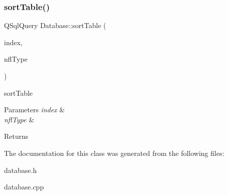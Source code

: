 \subsubsection{\texorpdfstring{sort\+Table()}{sortTable()}}
{\footnotesize\ttfamily Q\+Sql\+Query Database\+::sort\+Table (\begin{DoxyParamCaption}\item[{int}]{index,  }\item[{Q\+String}]{nfl\+Type }\end{DoxyParamCaption})}



sort\+Table 


\begin{DoxyParams}{Parameters}
{\em index} & \\
\hline
{\em nfl\+Type} & \\
\hline
\end{DoxyParams}
\begin{DoxyReturn}{Returns}

\end{DoxyReturn}


The documentation for this class was generated from the following files\+:\begin{DoxyCompactItemize}
\item 
database.\+h\item 
database.\+cpp\end{DoxyCompactItemize}
